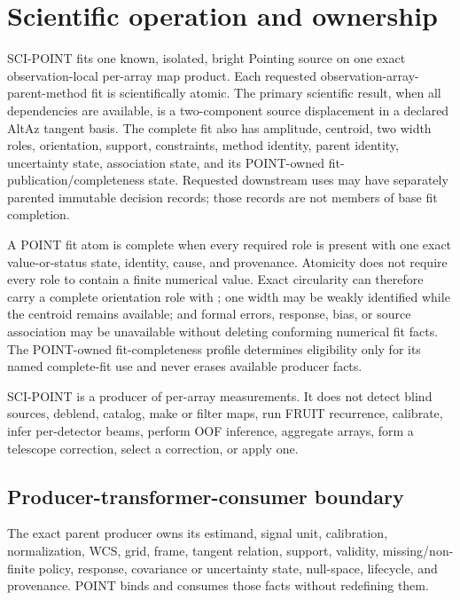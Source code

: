 \section{Scientific operation and ownership}\label{sec:operation}

SCI-POINT fits one known, isolated, bright Pointing source on one exact
observation-local per-array map product. Each requested
observation-array-parent-method fit is scientifically atomic. The primary
scientific result, when all dependencies are available, is a two-component
source displacement in a declared AltAz tangent basis. The complete fit also
has amplitude, centroid, two width roles, orientation, support, constraints,
method identity, parent identity, uncertainty state, association state, and
its POINT-owned fit-publication/completeness state. Requested downstream uses
may have separately parented immutable decision records; those records are not
members of base fit completion.

A POINT fit atom is complete when every required role is present with one
exact value-or-status state, identity, cause, and provenance. Atomicity does
not require every role to contain a finite numerical value. Exact circularity
can therefore carry a complete orientation role with
; one width may be weakly identified while
the centroid remains available; and formal errors, response, bias, or source
association may be unavailable without deleting conforming numerical fit
facts. The POINT-owned fit-completeness profile determines eligibility only
for its named complete-fit use and never erases available producer facts.

SCI-POINT is a producer of per-array measurements. It does not detect blind
sources, deblend, catalog, make or filter maps, run FRUIT recurrence, calibrate,
infer per-detector beams, perform OOF inference, aggregate arrays, form a
telescope correction, select a correction, or apply one.

\subsection{Producer-transformer-consumer boundary}\label{sec:ownership}

The exact parent producer owns its estimand, signal unit, calibration,
normalization, WCS, grid, frame, tangent relation, support, validity,
missing/non-finite policy, response, covariance or uncertainty state,
null-space, lifecycle, and provenance. POINT binds and consumes those facts
without redefining them.

